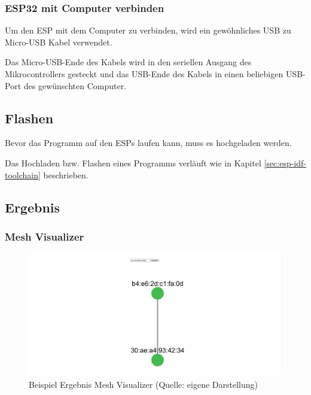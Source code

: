 \subsubsection{ESP32 mit Computer verbinden}
Um den ESP mit dem Computer zu verbinden, wird ein gewöhnliches USB zu Micro-USB Kabel verwendet.

Das Micro-USB-Ende des Kabels wird in den seriellen Ausgang des Mikrocontrollers gesteckt und das USB-Ende des Kabels in einen beliebigen USB-Port des gewünschten Computer.

\subsection{Flashen}

Bevor das Programm auf den ESPs laufen kann, muss es hochgeladen werden.

Das Hochladen bzw. Flashen eines Programms verläuft wie in Kapitel \ref{sec:esp-idf-toolchain} beschrieben.

\subsection{Ergebnis}\label{sec:example-result}

\subsubsection{Mesh Visualizer}

\begin{figure}[H]
    \begin{center}
        \includegraphics[scale=0.3]{images/example_result_mesh_visualizer.png}
        \caption{Beispiel Ergebnis Mesh Visualizer (Quelle: eigene Darstellung)}
        \label{abb:example_result_mesh_visualizer}
    \end{center}
\end{figure}

